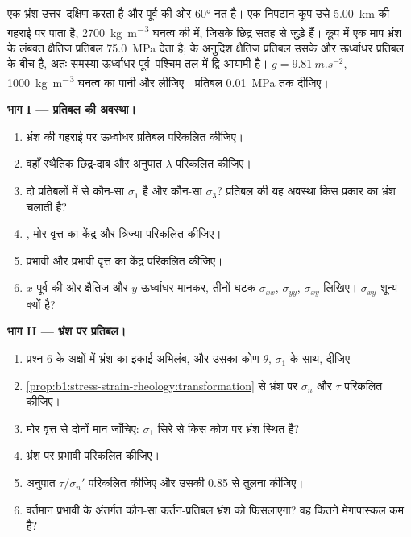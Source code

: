 \begin{problem}
\label{pb:b1:stress-strain-rheology:1}
एक भ्रंश उत्तर–दक्षिण  करता है और पूर्व की ओर \ang{60} नत है। एक निपटान-कूप उसे \qty{5.00}{km} की गहराई पर पाता है, \qty{2700}{kg.m^{-3}} घनत्व की  में, जिसके छिद्र सतह से जुड़े हैं। कूप में एक माप भ्रंश के लंबवत क्षैतिज प्रतिबल \qty{75.0}{MPa} देता है;  के अनुदिश क्षैतिज प्रतिबल उसके और ऊर्ध्वाधर प्रतिबल के बीच है, अतः समस्या ऊर्ध्वाधर पूर्व–पश्चिम तल में द्वि-आयामी है। $g = \qty{9.81}{m.s^{-2}}$, \qty{1000}{kg.m^{-3}} घनत्व का पानी और  लीजिए। प्रतिबल \qty{0.01}{MPa} तक दीजिए।

\medskip
\noindent\textbf{भाग I --- प्रतिबल की अवस्था।}
\begin{enumerate}
  \item भ्रंश की गहराई पर ऊर्ध्वाधर प्रतिबल परिकलित कीजिए।
  \item वहाँ स्थैतिक छिद्र-दाब और अनुपात $\lambda$ परिकलित कीजिए।
  \item दो प्रतिबलों में से कौन-सा $\sigma_1$ है और कौन-सा $\sigma_3$? प्रतिबल की यह अवस्था किस प्रकार का भ्रंश चलाती है?
  \item {}, मोर वृत्त का केंद्र और त्रिज्या परिकलित कीजिए।
  \item प्रभावी  और प्रभावी वृत्त का केंद्र परिकलित कीजिए।
  \item $x$ पूर्व की ओर क्षैतिज और $y$ ऊर्ध्वाधर मानकर, तीनों घटक $\sigma_{xx}$, $\sigma_{yy}$, $\sigma_{xy}$ लिखिए। $\sigma_{xy}$ शून्य क्यों है?
\end{enumerate}

\medskip
\noindent\textbf{भाग II --- भ्रंश पर प्रतिबल।}
\begin{enumerate}[resume]
  \item प्रश्न 6 के अक्षों में भ्रंश का इकाई अभिलंब, और उसका कोण $\theta$, $\sigma_1$ के साथ, दीजिए।
  \item \cref{prop:b1:stress-strain-rheology:transformation} से भ्रंश पर $\sigma_n$ और $\tau$ परिकलित कीजिए।
  \item मोर वृत्त से दोनों मान जाँचिए: $\sigma_1$ सिरे से किस कोण पर भ्रंश स्थित है?
  \item भ्रंश पर प्रभावी  परिकलित कीजिए।
  \item अनुपात $\tau/\sigma_n'$ परिकलित कीजिए और उसकी 0.85 से तुलना कीजिए।
  \item वर्तमान प्रभावी  के अंतर्गत कौन-सा कर्तन-प्रतिबल भ्रंश को फिसलाएगा? वह कितने मेगापास्कल कम है?
\end{enumerate}


\end{problem}
